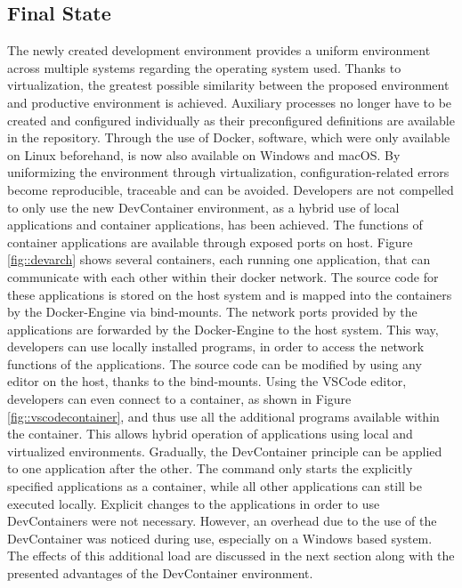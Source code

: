         \subsection{Final State}\label{sec::final}
        
        The newly created development environment provides a uniform environment across multiple systems regarding the operating system used. Thanks to virtualization, the greatest possible similarity between the proposed environment and productive environment is achieved. Auxiliary processes no longer have to be created and configured individually as their preconfigured definitions are available in the repository. Through the use of Docker, software, which were only available on Linux beforehand, is now also available on Windows and macOS. By uniformizing the environment through virtualization, configuration-related errors become reproducible, traceable and can be avoided.\newline
        Developers are not compelled to only use the new DevContainer environment, as a hybrid use of local applications and container applications, has been achieved. The functions of container applications are available through exposed ports on host. Figure \ref{fig::devarch} shows several containers, each running one application, that can communicate with each other within their docker network. The source code for these applications is stored on the host system and is mapped into the containers by the Docker-Engine via bind-mounts. The network ports provided by the applications are forwarded by the Docker-Engine to the host system. This way, developers can use locally installed programs, in order to access the network functions of the applications. The source code can be modified by using any editor on the host, thanks to the bind-mounts. Using the \ac{VSCode} editor, developers can even connect to a container, as shown in Figure \ref{fig::vscodecontainer}, and thus use all the additional programs available within the container. This allows hybrid operation of applications using local and virtualized environments. Gradually, the DevContainer principle can be applied to one application after the other. The command  only starts the explicitly specified applications as a container, while all other applications can still be executed locally. Explicit changes to the applications in order to use DevContainers were not necessary.\newline
        However, an overhead due to the use of the DevContainer was noticed during use, especially on a Windows based system. The effects of this additional load are discussed in the next section along with the presented advantages of the DevContainer environment.
